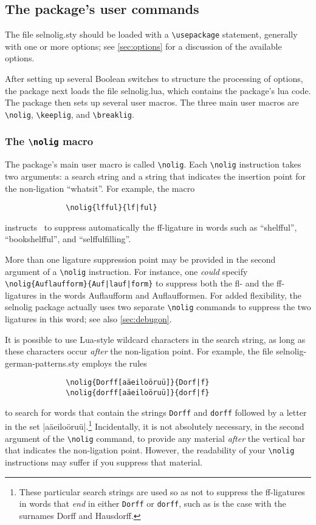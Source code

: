 \documentclass[11pt]{article}
\newcommand{\pkg}[1]{\textsf{#1}}
\newcommand{\opt}[1]{\texttt{#1}}
\newcommand{\cmmd}[1]{\texttt{\textbackslash #1}}
\begin{document}
\subsection{The package's user commands} \label{sec:syntax}

The file \pkg{selnolig.sty} should be loaded with a \cmmd{usepackage} statement, generally with one or more options; see \cref{sec:options} for a discussion of the available options. 

After setting up several Boolean switches to structure the processing of options, the package next loads the file \pkg{selnolig.lua}, which contains the package's lua code. The package then sets up several user macros. The three main user macros are \cmmd{nolig}, \cmmd{keeplig}, and \cmmd{breaklig}.



\subsubsection{The \cmmd{nolig} macro}
\label{sec:nolig}

\enlargethispage{0.3\baselineskip}

The package's main user macro is called \cmmd{nolig}. Each \cmmd{nolig} instruction takes two arguments: a search string and a string that indicates the insertion point for the non-ligation \enquote{whatsit}. For example, the macro
\begin{Verbatim}
              \nolig{lfful}{lf|ful}
\end{Verbatim}
instructs \LuaLaTeX\ to suppress automatically the ff-ligature in words such as \enquote{shelfful}, \enquote{bookshelfful}, and \enquote{selffulfilling}. 

More than one ligature suppression point may be provided in the second argument of a \cmmd{nolig} instruction. For instance, one \emph{could} specify \Verb+\nolig{Auflaufform}{Auf|lauf|form}+ to suppress both the fl- and the ff-ligatures in the words Auflaufform and Auflaufformen. For added flexibility, the \pkg{selnolig} package actually uses two separate \cmmd{nolig} commands to suppress the two ligatures in this word; see also \cref{sec:debugon}.


It is possible to use Lua-style wildcard characters in the search string, as long as these characters occur \emph{after} the non-ligation point. For example, the file \pkg{selnolig-german-patterns.sty} employs the rules 
\begin{Verbatim}
              \nolig{Dorff[aäeiloöruü]}{Dorf|f}
              \nolig{dorff[aäeiloöruü]}{dorf|f}
\end{Verbatim}
to search for words that contain the strings \opt{Dorff} and \opt{dorff} followed by a letter in the set |aäeiloöruü|.\footnote{These particular search strings are used so as not to suppress the ff-ligatures in words that \emph{end} in either \opt{Dorff} or \opt{dorff}, such as is the case with the surnames Dorff and Hausdorff.} Incidentally, it is not absolutely necessary, in the second argument of the \cmmd{nolig} command, to provide any material \emph{after} the vertical bar that indicates the non-ligation point. However, the readability of your \cmmd{nolig} instructions may suffer if you suppress that material.
\end{document}
